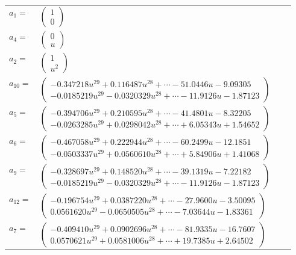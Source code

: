 \documentclass[1p]{elsarticle_modified}
\theoremstyle{definition}
\begin{document}
\begin{tabular}{m{7pt} m{180pt} m{7pt} m{180pt} }
\flushright $a_{1}=$&$\begin{pmatrix}1\\0\end{pmatrix}$ \\
\flushright $a_{4}=$&$\begin{pmatrix}0\\u\end{pmatrix}$ \\
\flushright $a_{2}=$&$\begin{pmatrix}1\\u^2\end{pmatrix}$ \\
\flushright $a_{10}=$&$\begin{pmatrix}-0.347218 u^{29}+0.116487 u^{28}+\cdots-51.0446 u-9.09305\\-0.0185219 u^{29}-0.0320329 u^{28}+\cdots-11.9126 u-1.87123\end{pmatrix}$ \\
\flushright $a_{5}=$&$\begin{pmatrix}-0.394706 u^{29}+0.210595 u^{28}+\cdots-41.4801 u-8.32205\\-0.0263285 u^{29}+0.0298042 u^{28}+\cdots+6.05343 u+1.54652\end{pmatrix}$ \\
\flushright $a_{6}=$&$\begin{pmatrix}-0.467058 u^{29}+0.222944 u^{28}+\cdots-60.2499 u-12.1851\\-0.0503337 u^{29}+0.0560610 u^{28}+\cdots+5.84906 u+1.41068\end{pmatrix}$ \\
\flushright $a_{9}=$&$\begin{pmatrix}-0.328697 u^{29}+0.148520 u^{28}+\cdots-39.1319 u-7.22182\\-0.0185219 u^{29}-0.0320329 u^{28}+\cdots-11.9126 u-1.87123\end{pmatrix}$ \\
\flushright $a_{12}=$&$\begin{pmatrix}-0.196754 u^{29}+0.0387220 u^{28}+\cdots-27.9600 u-3.50095\\0.0561620 u^{29}-0.0650505 u^{28}+\cdots-7.03644 u-1.83361\end{pmatrix}$ \\
\flushright $a_{7}=$&$\begin{pmatrix}-0.409410 u^{29}+0.0902696 u^{28}+\cdots-81.9335 u-16.7607\\0.0570621 u^{29}+0.0581006 u^{28}+\cdots+19.7385 u+2.64502\end{pmatrix}$ \\

\end{tabular}
\end{document}
